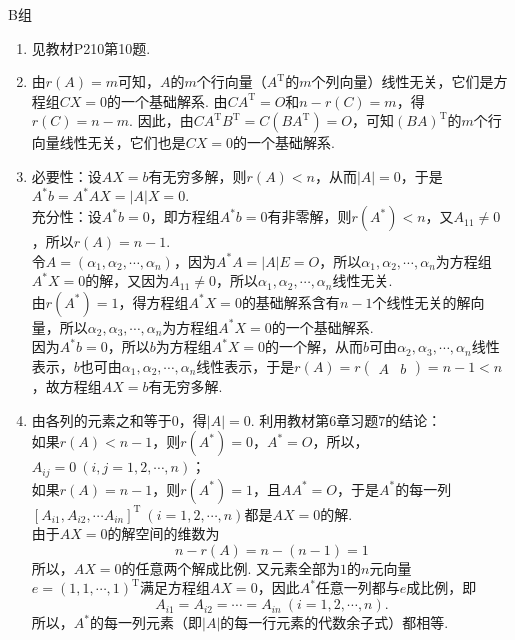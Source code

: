 \centerline{\heiti B组}
\begin{enumerate}
    \item 见教材P210第10题.
    \item
        由$r(A)=m$可知，$A$的$m$个行向量（$A^\mathrm{T}$的$m$个列向量）线性无关，它们是方程组$CX=0$的一个基础解系. 由$CA^\mathrm{T}=O$和$n-r(C)=m$，得$r(C)=n-m$. 因此，由$CA^\mathrm{T}B^\mathrm{T}=C(BA^\mathrm{T})=O$，可知$(BA)^\mathrm{T}$的$m$个行向量线性无关，它们也是$CX=0$的一个基础解系.
    \item
        必要性：设$AX=b$有无穷多解，则$r(A)<n$，从而$|A|=0$，于是$A^*b=A^*AX=|A|X=0.$\\
        充分性：设$A^*b=0$，即方程组$A^*b=0$有非零解，则$r(A^*)<n$，又$A_{11}\neq 0$，所以$r(A)=n-1$.\\
        令$A=(\alpha_1,\alpha_2,\cdots,\alpha_n)$，因为$A^*A=|A|E=O$，所以$\alpha_1,\alpha_2,\cdots,\alpha_n$为方程组$A^*X=0$的解，又因为$A_{11}\neq 0$，所以$\alpha_1,\alpha_2,\cdots,\alpha_n$线性无关.\\
        由$r(A^*)=1$，得方程组$A^*X=0$的基础解系含有$n-1$个线性无关的解向量，所以$\alpha_2,\alpha_3,\cdots,\alpha_n$为方程组$A^*X=0$的一个基础解系.\\
        因为$A^*b=0$，所以$b$为方程组$A^*X=0$的一个解，从而$b$可由$\alpha_2,\alpha_3,\cdots,\alpha_n$线性表示，$b$也可由$\alpha_1,\alpha_2,\cdots,\alpha_n$线性表示，于是$r(A) = r\begin{pmatrix}A & b\end{pmatrix}=n-1<n$，故方程组$AX=b$有无穷多解.
    \item
        由各列的元素之和等于$0$，得$|A|=0$.
        利用教材第$6$章习题$7$的结论：\\
        如果$r(A)<n-1$，则$r(A^*)=0$，$A^*=O$，所以，$A_{ij}=0\ (i,j=1,2,\cdots,n)$；\\
        如果$r(A)=n-1$，则$r(A^*)=1$，且$AA^*=O$，于是$A^*$的每一列$\left[A_{i1},A_{i2},\cdots A_{in}\right]^\mathrm{T} \ (i=1,2,\cdots,n)$都是$AX=0$的解.\\
        由于$AX=0$的解空间的维数为\begin{equation*} n-r(A)=n-(n-1)=1 \end{equation*}
        所以，$AX=0$的任意两个解成比例. 又元素全部为$1$的$n$元向量$e=(1,1,\cdots,1)^\mathrm{T}$满足方程组$AX=0$，因此$A^*$任意一列都与$e$成比例，即
        \begin{equation*}
            A_{i1}=A_{i2}=\cdots=A_{in} \ (i=1,2,\cdots,n).
        \end{equation*}
        所以，$A^*$的每一列元素（即$|A|$的每一行元素的代数余子式）都相等.\\

\end{enumerate}
